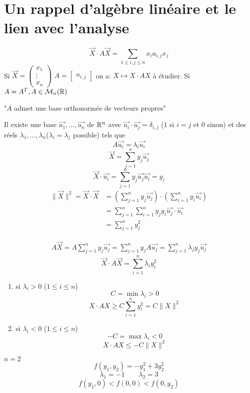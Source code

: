 \section{Un rappel d'algèbre linéaire et le lien avec l'analyse}
\[
    \vec{X} \cdot A\vec{X} = \sum_{1\le i,j \le n}^{} x_ia_{i,j}x_j
\] 
Si $\vec{X} = \begin{pmatrix} x_1 \\ \vdots \\ x_n \end{pmatrix}$ $A = \begin{bmatrix} a_{i,j} \end{bmatrix}$ on a: $X \mapsto X \cdot AX$ à étudier. Si $A = A^T, A \in \mathcal{M}_n(\mathbb{R})$
\begin{center}
   "$A$ admet une base orthonormée de vecteurs propres" 
\end{center}
Il existe une base $\vec{u_1}, \ldots, \vec{u_n}$ de $\mathbb{R}^n$ avec $\vec{u_i} \cdot \vec{u_j} = \delta_{i, j}$ ($1$ si  $i = j$ et  $0$ sinon) et des réels $\lambda_1, \ldots, \lambda_n$($\lambda_i = \lambda_j$ possible) tels que
\[
    A\vec{u_i} = \lambda_i\vec{u_i}
\] 
\[
    \vec{X} = \sum_{j=1}^{n} y_j\vec{u_j}
\] 
\[
    \vec{X} \cdot \vec{u_i} = \sum_{j=1}^{n} y_j\vec{u_j}\vec{u_i} = y_i
\] 
\begin{align*}
    \|\vec{X}\|^2 = \vec{X} \cdot \vec{X} &= \left( \sum_{j=1}^{n} y_j\vec{u_j} \right) \cdot \left( \sum_{i=1}^{n} y_i\vec{u_i} \right) \\
                                          &= \sum_{j=1}^{n} \sum_{i=1}^{n} y_jy_i\vec{u_j}\cdot \vec{u_i}\\ 
                                          &= \sum_{j=1}^{n} y_j^2
\end{align*}

\begin{align*}
    A\vec{X} = A \sum_{j=1}^{n} y_j\vec{u_j} = \sum_{j=1}^{n} y_jA\vec{u_j} = \sum_{j=1}^{n} \lambda_jy_j\vec{u_j}
\end{align*}
\[
    \vec{X} \cdot A\vec{X} = \sum_{i=1}^{n} \lambda_iy_i^2
\] 
\begin{enumerate}
    \item si $\lambda_i > 0$ ($1 \le i \le n$)
        \[
        C = \min \lambda_i > 0
        \] 
        \[
        X \cdot AX \ge C \sum_{i=1}^{n} y_i^2 = C \|X\|^2
        \] 
    \item si $\lambda_i < 0$ ($1 \le i \le n$)
        \[
        -C = \max \lambda_i < 0
        \] 
        \[
        X \cdot AX \le -C\|X\|^2
        \] 
\end{enumerate}
\begin{eg}
   $n = 2$ 
   \[
   f(y_1, y_2) = -y_1^2 + 3y_2^2
   \] 
   \[
   \lambda_1 = -1 \qquad \lambda_2 = 3
   \] 
   \[
   f(y_1, 0) < f(0, 0) < f(0, y_2)
   \] 
\end{eg}

